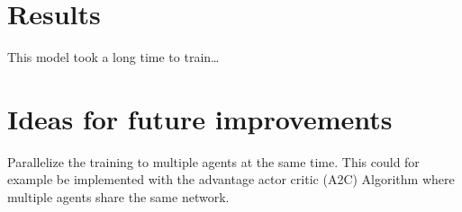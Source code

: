 \documentclass[12pt,a4paper]{article}
\begin{document}
    \section{Results}\label{sec:results}
    This model took a long time to train\ldots


    \section{Ideas for future improvements}\label{sec:ideas}
    Parallelize the training to multiple agents at the same time.
    This could for example be implemented with the advantage actor critic (A2C) Algorithm where multiple agents share the same network.
\end{document}
